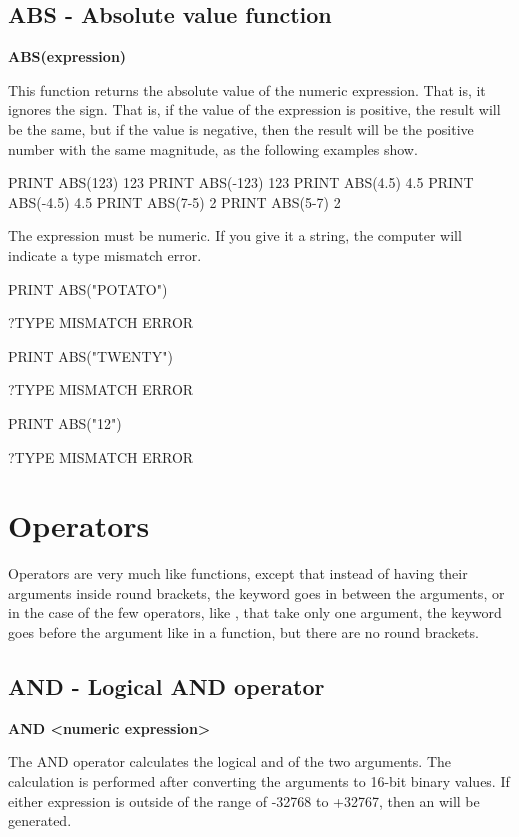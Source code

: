 \subsection{ABS - Absolute value function}

{\bf ABS(expression)}

This function returns the absolute value of the numeric expression.
That is, it ignores the sign.  That is, if the value of the expression is positive,
the result will be the same, but if the value is negative, then the result
will be the positive number with the same magnitude, as the following examples show.

\begin{screenoutput}
  PRINT ABS(123)
  123
  PRINT ABS(-123)
  123
  PRINT ABS(4.5)
  4.5
  PRINT ABS(-4.5)
  4.5
  PRINT ABS(7-5)
  2
  PRINT ABS(5-7)
  2
\end{screenoutput}

The expression must be numeric. If you give it a string, the computer will indicate a type mismatch error.

\begin{screenoutput}
  PRINT ABS("POTATO")

  ?TYPE MISMATCH ERROR

  PRINT ABS("TWENTY")

  ?TYPE MISMATCH ERROR

  PRINT ABS("12")

  ?TYPE MISMATCH ERROR
\end{screenoutput}

\section{Operators}

Operators are very much like functions, except that instead of having their arguments inside round brackets,
the keyword goes in between the arguments, or in the case of the few operators, like , that take only one argument,
the keyword goes before the argument like in a function, but there are no round brackets.

\subsection{AND - Logical AND operator}

{\bf <numeric expression> AND <numeric expression>}

The AND operator calculates the logical and of the two arguments.
The calculation is performed after converting the arguments to 16-bit binary values.
If either expression is outside of the range of -32768 to +32767, then an  will be generated.

